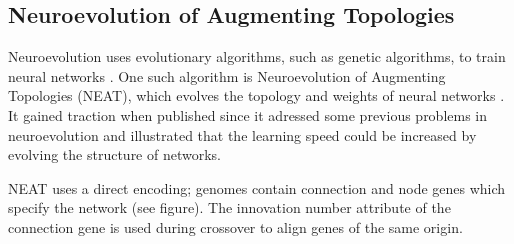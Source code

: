 \newpage

\subsection{Neuroevolution of Augmenting Topologies}
Neuroevolution uses evolutionary algorithms, such as genetic algorithms, to train neural networks \cite{neuroevolution_review}.
One such algorithm is Neuroevolution of Augmenting Topologies (NEAT), which evolves the topology and weights of neural networks \cite{neat_main}.
It gained traction when published since it adressed some previous problems in neuroevolution and illustrated that the learning speed could
be increased by evolving the structure of networks.

NEAT uses a direct encoding; genomes contain connection and node genes which specify the network (see figure).
The innovation number attribute of the connection gene is used during crossover to align genes of the same origin.

\newline
{}
\newline
{}
\newline
{}

